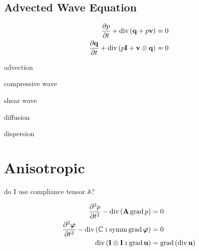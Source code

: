 \subsection{Advected Wave Equation}

\begin{align}
	\pdv{p}{t} + \operatorname{div} \left( \vb{q} + p \vb{v} \right) &= 0 \\
	\pdv{\vb{q}}{t} + \operatorname{div} \left( p \vb{I} + \vb{v} \otimes \vb{q} \right) &= 0
\end{align}

advection

compressive wave

shear wave

diffusion

dispersion

\section{Anisotropic}

do I use compliance tensor $\mathbb{A}$?

\begin{align*}
	\pdv[2]{p}{t} - \operatorname{div} \left( \vb{A} \operatorname{grad} p \right) &= 0 \\
	\pdv[2]{\vb*{\varphi}}{t} - \operatorname{div} \left( \mathbb{C} \boldsymbol{:} \operatorname{symm} \operatorname{grad} \vb*{\varphi} \right) &= 0 \\
	\operatorname{div} \left( \vb{I} \otimes \vb{I} \boldsymbol{:} \operatorname{grad} \vb{u} \right) &= \operatorname{grad} \left( \operatorname{div}{\vb{u}} \right)
\end{align*}